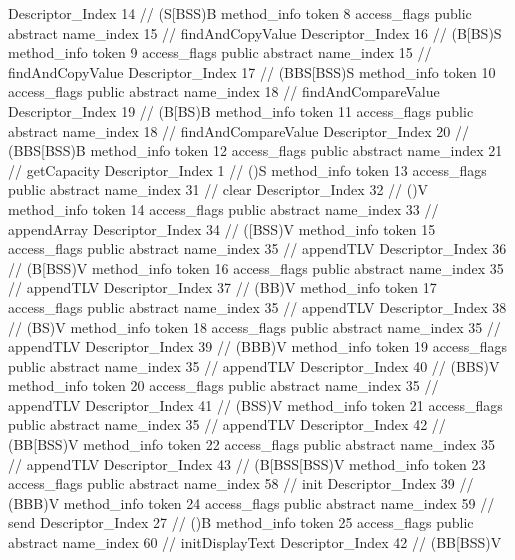 {{{{{					Descriptor_Index	14		// (S[BSS)B
				}
				method_info {
					token	8
					access_flags	public abstract
					name_index	15		// findAndCopyValue
					Descriptor_Index	16		// (B[BS)S
				}
				method_info {
					token	9
					access_flags	public abstract
					name_index	15		// findAndCopyValue
					Descriptor_Index	17		// (BBS[BSS)S
				}
				method_info {
					token	10
					access_flags	public abstract
					name_index	18		// findAndCompareValue
					Descriptor_Index	19		// (B[BS)B
				}
				method_info {
					token	11
					access_flags	public abstract
					name_index	18		// findAndCompareValue
					Descriptor_Index	20		// (BBS[BSS)B
				}
				method_info {
					token	12
					access_flags	public abstract
					name_index	21		// getCapacity
					Descriptor_Index	1		// ()S
				}
				method_info {
					token	13
					access_flags	public abstract
					name_index	31		// clear
					Descriptor_Index	32		// ()V
				}
				method_info {
					token	14
					access_flags	public abstract
					name_index	33		// appendArray
					Descriptor_Index	34		// ([BSS)V
				}
				method_info {
					token	15
					access_flags	public abstract
					name_index	35		// appendTLV
					Descriptor_Index	36		// (B[BSS)V
				}
				method_info {
					token	16
					access_flags	public abstract
					name_index	35		// appendTLV
					Descriptor_Index	37		// (BB)V
				}
				method_info {
					token	17
					access_flags	public abstract
					name_index	35		// appendTLV
					Descriptor_Index	38		// (BS)V
				}
				method_info {
					token	18
					access_flags	public abstract
					name_index	35		// appendTLV
					Descriptor_Index	39		// (BBB)V
				}
				method_info {
					token	19
					access_flags	public abstract
					name_index	35		// appendTLV
					Descriptor_Index	40		// (BBS)V
				}
				method_info {
					token	20
					access_flags	public abstract
					name_index	35		// appendTLV
					Descriptor_Index	41		// (BSS)V
				}
				method_info {
					token	21
					access_flags	public abstract
					name_index	35		// appendTLV
					Descriptor_Index	42		// (BB[BSS)V
				}
				method_info {
					token	22
					access_flags	public abstract
					name_index	35		// appendTLV
					Descriptor_Index	43		// (B[BSS[BSS)V
				}
				method_info {
					token	23
					access_flags	public abstract
					name_index	58		// init
					Descriptor_Index	39		// (BBB)V
				}
				method_info {
					token	24
					access_flags	public abstract
					name_index	59		// send
					Descriptor_Index	27		// ()B
				}
				method_info {
					token	25
					access_flags	public abstract
					name_index	60		// initDisplayText
					Descriptor_Index	42		// (BB[BSS)V
}}}}}
